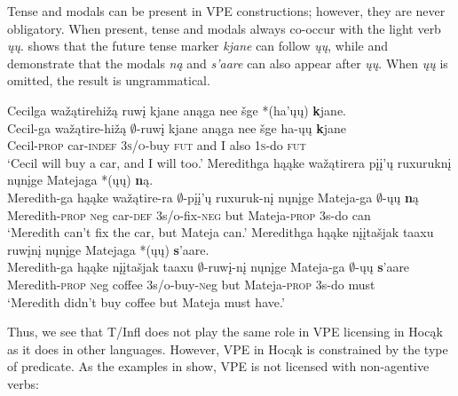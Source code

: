 \documentclass[output=paper]{LSP/langsci}
\begin{document}
Tense and modals can be present in VPE constructions; however, they are never obligatory. When present, tense and modals always co-occur with the light verb \emph{ųų}.  shows that the future tense marker \emph{kjane} can follow \emph{ųų}, while  and  demonstrate that the modals \emph{ną} and \emph{s'aare} can also appear after \emph{ųų}. When \emph{ųų} is omitted, the result is ungrammatical.

\ea\label{ex:johnson:19}
\ea\label{ex:johnson:19a}
\glll Cecilga wažątirehižą ruwį kjane anąga nee šge *(ha'ųų) {\textbf kjane}.\\
Cecil-ga wažątire-hižą $\emptyset$-ruwį kjane anąga nee šge ha-ųų {\textbf kjane}\\
Cecil-\textsc{prop} car-\textsc{indef} \textsc{3s/o}-buy \textsc{fut} and I also \textsc{1s}-do \textsc{fut}\\
\trans `Cecil will buy a car, and I will too.' 
\ex\label{ex:johnson:19b}
\glll Meredithga hąąke wažątirera {pįį'ų ruxuruknį} nųnįge Matejaga *(ųų) {\textbf ną}.\\
Meredith-ga hąąke wažątire-ra {$\emptyset$-pįį'ų ruxuruk-nį} nųnįge Mateja-ga $\emptyset$-ųų {\textbf ną}\\
Meredith-\textsc{prop} {\textsc neg} car-\textsc{def} {\textsc 3s/o}-fix-\textsc{neg} but Mateja-\textsc{prop} {\textsc 3s}-do can\\
\trans `Meredith can't fix the car, but Mateja can.'
\ex\label{ex:johnson:19c}
\glll Meredithga hąąke {nįįtašjak taaxu} ruwįnį nųnįge Matejaga *(ųų) {\textbf s'aare}.\\ 
Meredith-ga hąąke {nįįtašjak taaxu} $\emptyset$-ruwį-nį nųnįge Mateja-ga $\emptyset$-ųų {\textbf s'aare}\\
Meredith-\textsc{prop} {\textsc neg} coffee {\textsc 3s/o}-buy-{\textsc neg} but Mateja-\textsc{prop} {\textsc 3s}-do must\\
\trans `Meredith didn't buy coffee but Mateja must have.' 
\z
\z

Thus, we see that T/Infl does not play the same role in VPE licensing in Hocąk as it does in other languages. However, VPE in Hocąk is constrained by the type of predicate. As the examples in  show, VPE is not licensed with non-agentive verbs:
\end{document}
